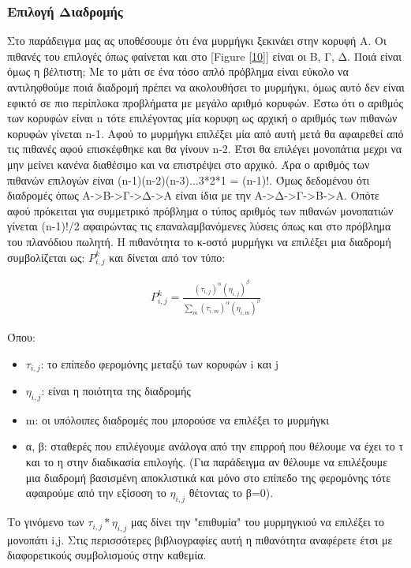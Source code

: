 \subsubsection{Επιλογή Διαδρομής}
Στο παράδειγμα μας ας υποθέσουμε ότι ένα μυρμήγκι ξεκινάει στην κορυφή Α. Οι πιθανές του επιλογές όπως φαίνεται και στο [Figure \ref{10}] είναι οι Β, Γ, Δ. Ποιά είναι όμως η βέλτιστη; 
Με το μάτι σε ένα τόσο απλό πρόβλημα είναι εύκολο να αντιληφθούμε ποιά διαδρομή πρέπει να ακολουθήσει το μυρμήγκι, όμως αυτό δεν είναι εφικτό σε πιο περίπλοκα προβλήματα με μεγάλο αριθμό κορυφών. Έστω ότι ο αριθμός των κορυφών είναι n τότε επιλέγοντας μία κορυφη ως αρχική ο αριθμός των πιθανών κορυφών γίνεται n-1. Αφού το μυρμήγκι επιλέξει μία από αυτή μετά θα αφαιρεθεί από τις πιθανές αφού επισκέφθηκε και θα γίνουν n-2. Έτσι θα επιλέγει μονοπάτια μεχρι να μην μείνει κανένα διαθέσιμο και να επιστρέψει στο αρχικό. Άρα ο αριθμός των πιθανών επιλογών είναι (n-1)(n-2)(n-3)...3*2*1 = (n-1)!. Όμως δεδομένου ότι διαδρομές όπως Α->Β->Γ->Δ->Α είναι ίδια με την Α->Δ->Γ->Β->Α. Οπότε αφού πρόκειται για συμμετρικό πρόβλημα ο τύπος αριθμός των πιθανών μονοπατιών γίνεται (n-1)!/2 αφαιρώντας τις επαναλαμβανόμενες λύσεις όπως και στο πρόβλημα του πλανόδιου πωλητή. 
Η πιθανότητα το κ-οστό μυρμήγκι να επιλέξει μια διαδρομή συμβολίζεται ως: $P^k_{i,j}$ και δίνεται από τον τύπο: \cite{CPVBK}

\begin{align} \label{eq:3}
	P^k_{i,j}=\frac{(τ_{i,j})^α(η_{i,j})^β}{\sum_{m}(τ_{i,m})^α(η_{i,m})^β}
\end{align}

Όπου: 
\begin{itemize}
    \item $τ_{i,j}$: το επίπεδο φερομόνης μεταξύ των κορυφών i και j
    \item $η_{i,j}$: είναι η ποιότητα της διαδρομής
    \item m: οι υπόλοιπες διαδρομές που μπορούσε να επιλέξει το μυρμήγκι
    \item α, β: σταθερές που επιλέγουμε ανάλογα από την επιρροή που θέλουμε να έχει το τ και το η στην διαδικασία επιλογής. (Για παράδειγμα αν θέλουμε να επιλέξουμε μια διαδρομή βασισμένη αποκλιστικά και μόνο στο επίπεδο της φερομόνης τότε αφαιρούμε από την εξίσοση το $η_{i,j}$ θέτοντας το β=0).
\end{itemize}
Το γινόμενο των $τ_{i,j}*η_{i,j}$ μας δίνει την "επιθυμία" του μυρμηγκιού να επιλέξει το μονοπάτι i,j.
Στις περισσότερες βιβλιογραφίες αυτή η πιθανότητα αναφέρετε έτσι με διαφορετικούς συμβολισμούς στην καθεμία. 

